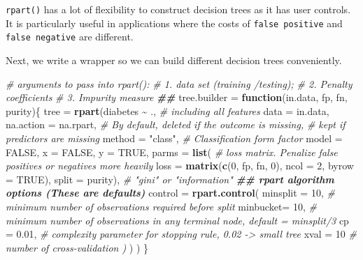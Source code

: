 \documentclass[
]{book}
\newenvironment{Shaded}{\begin{snugshade}}{\end{snugshade}}
\newcommand{\AttributeTok}[1]{\textcolor[rgb]{0.13,0.29,0.53}{#1}}
\newcommand{\CommentTok}[1]{\textcolor[rgb]{0.56,0.35,0.01}{\textit{#1}}}
\newcommand{\ConstantTok}[1]{\textcolor[rgb]{0.56,0.35,0.01}{#1}}
\newcommand{\ControlFlowTok}[1]{\textcolor[rgb]{0.13,0.29,0.53}{\textbf{#1}}}
\newcommand{\DecValTok}[1]{\textcolor[rgb]{0.00,0.00,0.81}{#1}}
\newcommand{\DocumentationTok}[1]{\textcolor[rgb]{0.56,0.35,0.01}{\textbf{\textit{#1}}}}
\newcommand{\FloatTok}[1]{\textcolor[rgb]{0.00,0.00,0.81}{#1}}
\newcommand{\FunctionTok}[1]{\textcolor[rgb]{0.13,0.29,0.53}{\textbf{#1}}}
\newcommand{\NormalTok}[1]{#1}
\newcommand{\OtherTok}[1]{\textcolor[rgb]{0.56,0.35,0.01}{#1}}
\newcommand{\SpecialCharTok}[1]{\textcolor[rgb]{0.81,0.36,0.00}{\textbf{#1}}}
\newcommand{\StringTok}[1]{\textcolor[rgb]{0.31,0.60,0.02}{#1}}
\begin{document}
\hfill\break

\texttt{rpart()} has a lot of flexibility to construct decision trees as it has user controls. It is particularly useful in applications where the costs of \texttt{false\ positive} and \texttt{false\ negative} are different.

Next, we write a wrapper so we can build different decision trees conveniently.

\begin{Shaded}
\begin{Highlighting}[]
\CommentTok{\# arguments to pass into rpart():}
\CommentTok{\# 1. data set (training /testing); }
\CommentTok{\# 2. Penalty coefficients}
\CommentTok{\# 3. Impurity measure}
\DocumentationTok{\#\# }
\NormalTok{tree.builder }\OtherTok{=} \ControlFlowTok{function}\NormalTok{(in.data, fp, fn, purity)\{}
\NormalTok{   tree }\OtherTok{=} \FunctionTok{rpart}\NormalTok{(diabetes }\SpecialCharTok{\textasciitilde{}}\NormalTok{ .,                }\CommentTok{\# including all features}
                \AttributeTok{data =}\NormalTok{ in.data, }
                \AttributeTok{na.action  =}\NormalTok{ na.rpart,       }\CommentTok{\# By default, deleted if the outcome is missing, }
                                             \CommentTok{\# kept if predictors are missing}
                \AttributeTok{method =} \StringTok{"class"}\NormalTok{,            }\CommentTok{\# Classification form factor}
                \AttributeTok{model  =} \ConstantTok{FALSE}\NormalTok{,}
                \AttributeTok{x =} \ConstantTok{FALSE}\NormalTok{,}
                \AttributeTok{y =} \ConstantTok{TRUE}\NormalTok{,}
            \AttributeTok{parms =} \FunctionTok{list}\NormalTok{( }\CommentTok{\# loss matrix. Penalize false positives or negatives more heavily}
                         \AttributeTok{loss =} \FunctionTok{matrix}\NormalTok{(}\FunctionTok{c}\NormalTok{(}\DecValTok{0}\NormalTok{, fp, fn, }\DecValTok{0}\NormalTok{), }\AttributeTok{ncol =} \DecValTok{2}\NormalTok{, }\AttributeTok{byrow =} \ConstantTok{TRUE}\NormalTok{),   }
                         \AttributeTok{split =}\NormalTok{ purity),          }\CommentTok{\# "gini" or "information"}
             \DocumentationTok{\#\# rpart algorithm options (These are defaults)}
             \AttributeTok{control =} \FunctionTok{rpart.control}\NormalTok{(}
                        \AttributeTok{minsplit =} \DecValTok{10}\NormalTok{,  }\CommentTok{\# minimum number of observations required before split}
                        \AttributeTok{minbucket=} \DecValTok{10}\NormalTok{,  }\CommentTok{\# minimum number of observations in any terminal node, default = minsplit/3}
                        \AttributeTok{cp  =} \FloatTok{0.01}\NormalTok{,  }\CommentTok{\# complexity parameter for stopping rule, 0.02 {-}\textgreater{} small tree }
                       \AttributeTok{xval =} \DecValTok{10}     \CommentTok{\# number of cross{-}validation )}
\NormalTok{                        )}
\NormalTok{             )}
\NormalTok{  \}}
\end{Highlighting}
\end{Shaded}
\end{document}
